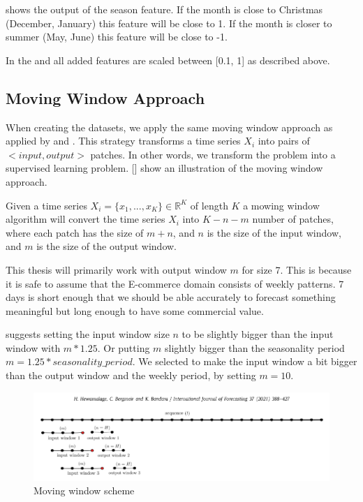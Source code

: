  shows the output of the season feature.
If the month is close to Christmas (December, January) this feature will be close to 1.
If the month is closer to summer (May, June) this feature will be close to -1.

In the and all added features are scaled between [0.1, 1] as described above.


\subsection{Moving Window Approach}
\label{section:Data:Preprocessing:moving-window-approach}
When creating the datasets, we apply the same moving window approach as applied by \cite{Bandara2019} and \cite{Hewamalage2021}.
This strategy transforms a time series $X_i$ into pairs of $<input, output>$ patches.
In other words, we transform the problem into a supervised learning problem.
  [] show an illustration of the moving window approach.

Given a time series $X_i = \{x_1, ..., x_K\} \in \mathbb{R}^K$ of length $K$ a mowing
window algorithm will convert the time series $X_i$ into $K-n-m$ number of patches,
where each patch has the size of $m+n$, and $n$ is the size of the input window,
and $m$ is the size of the output window.

This thesis will primarily work with output window $m$ for size 7.
This is because it is safe to assume that the E-commerce domain consists of weekly patterns.
7 days is short enough that we should be able accurately to forecast something meaningful
but long enough to have some commercial value.

\cite{Hewamalage2021} suggests setting the input window size $n$ to be slightly
bigger than the input window with $m * 1.25$. Or putting $m$ slightly bigger than
the seasonality period $m = 1.25 * seasonality\_period$.
We selected to make the input window a bit bigger than the output window and the weekly
period, by setting $m = 10$.
\begin{figure}[h!]
  \centering
  \includegraphics[width=\textwidth]{./figs/illustrations/moving_window_illustration.png}
  \hfill
  \caption{Moving window scheme \citep{Hewamalage2021}}
  \label{fig:dataset:moving_window_scheme}
\end{figure}



